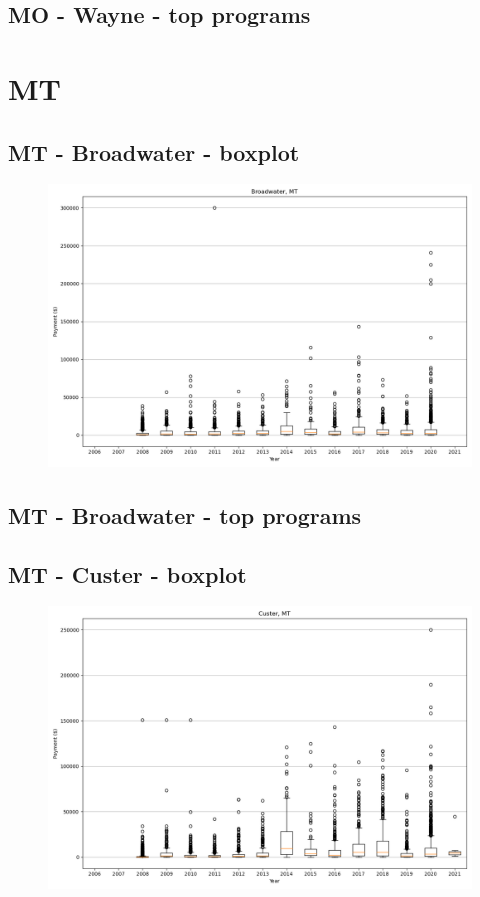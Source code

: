 \subsection*{MO - Wayne - top programs}

\newpage
\section*{MT}
\subsection*{MT - Broadwater - boxplot}
\begin{figure}[h]
\centering
\includegraphics[width=7in]{../output/boxplots/counties/Broadwater-MT_boxplot.png}
\end{figure}


\subsection*{MT - Broadwater - top programs}

\newpage
\subsection*{MT - Custer - boxplot}
\begin{figure}[h]
\centering
\includegraphics[width=7in]{../output/boxplots/counties/Custer-MT_boxplot.png}
\end{figure}


